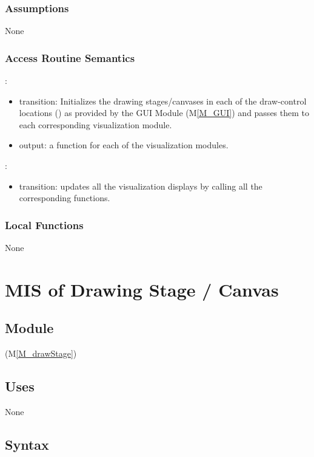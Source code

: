 \documentclass[12pt, titlepage]{article}
\newcommand{\mref}[1]{M\ref{#1}}
\newcommand{\mrefp}[1]{(\mref{#1})}
\newcommand{\mreff}[1]{Module \mrefp{#1}}
\begin{document}
\subsubsection{Assumptions}
None

\subsubsection{Access Routine Semantics}

\noindent {}:
\begin{itemize}
\item transition: Initializes the drawing stages/canvases in each of the
  draw-control locations ()
  as provided by the GUI \mreff{M_GUI} and passes them to each corresponding visualization module.
\item output: a  function for each of the visualization modules.
\end{itemize}

\noindent {}:
\begin{itemize}
\item transition: updates all the visualization displays by calling all the corresponding
    functions.
\end{itemize}

\subsubsection{Local Functions}
None

\newpage




\section{MIS of Drawing Stage / Canvas} \label{MS_drawStage}

\subsection{Module}
 \mrefp{M_drawStage} 

\subsection{Uses}
None

\subsection{Syntax}
\end{document}
